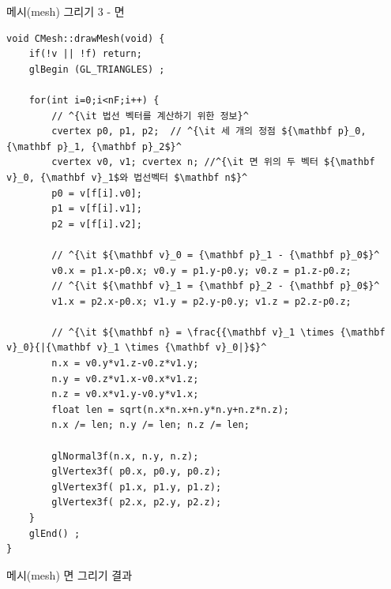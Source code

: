 \documentclass{beamer}
\begin{document}
\begin{frame}[fragile]{메시(mesh) 그리기 3 - 면}

\lstset{language=C++, escapechar=^} 
\begin{lstlisting}
void CMesh::drawMesh(void) {
    if(!v || !f) return;
    glBegin (GL_TRIANGLES) ; 

    for(int i=0;i<nF;i++) {
        // ^{\it 법선 벡터를 계산하기 위한 정보}^
        cvertex p0, p1, p2;  // ^{\it 세 개의 정점 ${\mathbf p}_0, {\mathbf p}_1, {\mathbf p}_2$}^
        cvertex v0, v1; cvertex n; //^{\it 면 위의 두 벡터 ${\mathbf v}_0, {\mathbf v}_1$와 법선벡터 $\mathbf n$}^
        p0 = v[f[i].v0];
        p1 = v[f[i].v1];
        p2 = v[f[i].v2];

        // ^{\it ${\mathbf v}_0 = {\mathbf p}_1 - {\mathbf p}_0$}^
        v0.x = p1.x-p0.x; v0.y = p1.y-p0.y; v0.z = p1.z-p0.z; 
        // ^{\it ${\mathbf v}_1 = {\mathbf p}_2 - {\mathbf p}_0$}^
        v1.x = p2.x-p0.x; v1.y = p2.y-p0.y; v1.z = p2.z-p0.z;

        // ^{\it ${\mathbf n} = \frac{{\mathbf v}_1 \times {\mathbf v}_0}{|{\mathbf v}_1 \times {\mathbf v}_0|}$}^
        n.x = v0.y*v1.z-v0.z*v1.y;
        n.y = v0.z*v1.x-v0.x*v1.z;
        n.z = v0.x*v1.y-v0.y*v1.x;
        float len = sqrt(n.x*n.x+n.y*n.y+n.z*n.z); 
        n.x /= len; n.y /= len; n.z /= len;

        glNormal3f(n.x, n.y, n.z); 
        glVertex3f( p0.x, p0.y, p0.z); 
        glVertex3f( p1.x, p1.y, p1.z); 
        glVertex3f( p2.x, p2.y, p2.z);
    }
    glEnd() ;
}
\end{lstlisting}


\end{frame}

\begin{frame}[fragile]{메시(mesh) 면 그리기 결과}

\begin{figure}[h!]
  \centering
\end{figure}

\end{frame}
\end{document}

